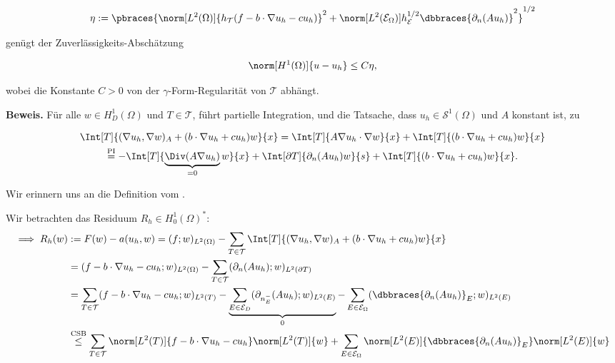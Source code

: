 \begin{solution}
\begin{enumerate}[label = \textbf{\alph*)}]
\begin{tcolorbox}[standard jigsaw, opacityback = 0]
    \begin{align*}
      \eta
      :=
      \pbraces
      {
        \norm[L^2(\Omega)]{h_\mathcal{T} (f - b \cdot \nabla u_h - c u_h)}^2
        +
        \norm[L^2(\mathcal{E}_\Omega)]{h_\mathcal{E}^{1/2} \dbbraces{\partial_n (A u_h)}}^2
      }^{1/2}
    \end{align*}

    genügt der Zuverlässigkeits-Abschätzung

    \begin{align*}
      \norm[H^1(\Omega)]{u - u_h}
      \leq
      C \eta,
    \end{align*}

    wobei die Konstante $C > 0$ von der $\gamma$-Form-Regularität von $\mathcal{T}$ abhängt.

  \end{tcolorbox}

  \textbf{Beweis.}
  Für alle $w \in H_D^1(\Omega)$ und $T \in \mathcal{T}$, führt partielle Integration, und die Tatsache, dass $u_h \in \mathcal{S}^1(\Omega)$ und $A$ konstant ist, zu

  \begin{multline*}
    \Int[T]{(\nabla u_h, \nabla w)_A + (b \cdot \nabla u_h + c u_h) w}{x}
    =
    \Int[T]{A \nabla u_h \cdot \nabla w}{x}
    +
    \Int[T]{(b \cdot \nabla u_h + c u_h) w}{x} \\
    \stackrel
    {
      \mathrm{PI}
    }{=}
    -\Int[T]
    {
      \underbrace
      {
        \Div(A \nabla u_h)
      }_{=0}
      w
    }{x}
    +
    \Int[\partial T]{\partial_n(A u_h) w}{s}
    +
    \Int[T]{(b \cdot \nabla u_h + c u_h) w}{x}.
  \end{multline*}

  Wir erinnern uns an die Definition vom .


  Wir betrachten das Residuum $R_h \in H_0^1(\Omega)^*$:
  \begin{align*}
    \implies
    R_h(w)
    & :=
    F(w) - a(u_h, w)
    =
    (f; w)_{L^2(\Omega)}
    -
    \sum_{T \in \mathcal{T}}
    \Int[T]{(\nabla u_h, \nabla w)_A + (b \cdot \nabla u_h + c u_h) w}{x} \\
    & =
    (f - b \cdot \nabla u_h - c u_h; w)_{L^2(\Omega)}
    -
    \sum_{T \in \mathcal{T}}
    (\partial_n (A u_h); w)_{L^2(\partial T)} \\
    & =
    \sum_{T \in \mathcal{T}}
    (f - b \cdot \nabla u_h - c u_h; w)_{L^2(T)}
    -
    \underbrace
    {
      \sum_{E \in \mathcal{E}_D}
      (\partial_{n_E^-} (A u_h); w)_{L^2(E)}
    }_0
    -
    \sum_{E \in \mathcal{E}_\Omega}
    (\dbbraces{\partial_n (A u_h)}_E; w)_{L^2(E)} \\
    & \stackrel
    {
      \mathrm{CSB}
    }{\leq}
    \sum_{T \in \mathcal{T}}
    \norm[L^2(T)]{f - b \cdot \nabla u_h - c u_h}
    \norm[L^2(T)]{w}
    +
    \sum_{E \in \mathcal{E}_\Omega}
    \norm[L^2(E)]{\dbbraces{\partial_n(A u_h)}_E}
    \norm[L^2(E)]{w}
  \end{align*}


\end{enumerate}
\end{solution}

